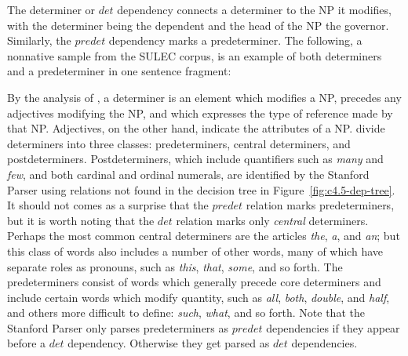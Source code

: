 \documentclass[main.tex]{subfiles}
\begin{document}
The determiner or $det$ dependency connects a determiner to the NP it modifies, with the determiner being the dependent and the head of the NP the governor. Similarly, the $predet$ dependency marks a predeterminer. The following, a nonnative sample from the SULEC corpus, is an example of both determiners and a predeterminer in one sentence fragment: 
\newline\newline {}
\newline

By the analysis of \citet[p. 253]{quirk:1985}, a determiner is an element which modifies a NP, precedes any adjectives modifying the NP, and which expresses the type of reference made by that NP. Adjectives, on the other hand, indicate the attributes of a NP. \citeauthor{quirk:1985} divide determiners into three classes: predeterminers, central determiners, and postdeterminers. Postdeterminers, which include quantifiers such as \textit{many} and \textit{few}, and both cardinal and ordinal numerals, are identified by the Stanford Parser using relations not found in the decision tree in Figure~\ref{fig:c4.5-dep-tree}. It should not comes as a surprise that the $predet$ relation marks predeterminers, but it is worth noting that the $det$ relation marks only \textit{central} determiners. Perhaps the most common central determiners are the articles \textit{the}, \textit{a}, and \textit{an}; but this class of words also includes a number of other words, many of which have separate roles as pronouns, such as \textit{this}, \textit{that}, \textit{some}, and so forth. The predeterminers consist of words which generally precede core determiners and include certain words which modify quantity, such as \textit{all}, \textit{both}, \textit{double}, and \textit{half}, and others more difficult to define: \textit{such}, \textit{what}, and so forth. Note that the Stanford Parser only parses predeterminers as $predet$ dependencies if they appear before a $det$ dependency. Otherwise they get parsed as $det$ dependencies.
\end{document}
